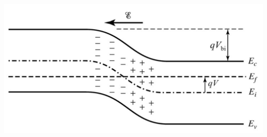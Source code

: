 \begin{multicols}{3}
          \medbreak\noindent\minipage{\columnwidth}
            \includegraphics[width=\columnwidth]{LectureNotesIIJunc2.png}
        \endminipage\medbreak 
   \end{multicols}
   \newpage
